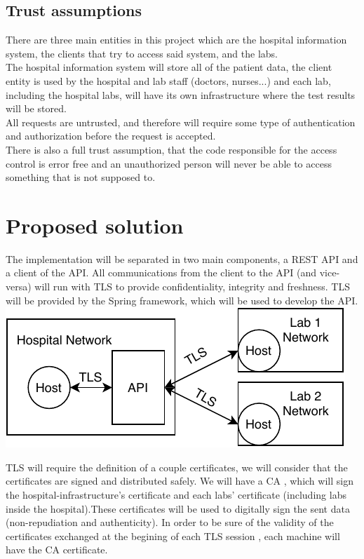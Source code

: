 \subsection{Trust assumptions}


There are three main entities in this project which are the hospital information system, the clients that try to access said system, and the labs. \\


The hospital information system will store all of the patient data, the client entity is used by the hospital and lab staff (doctors, nurses...) and each lab, including the hospital labs, will have its own infrastructure where the test results will be stored. \\

All requests are untrusted, and therefore will require some type of authentication and authorization before the request is accepted. \\ 

There is also a full trust assumption, that the code responsible for the access control is error free and an unauthorized person will never be able to access something that is not supposed to. \\

\section{Proposed solution}

The implementation will be separated in two main components, a REST API and a client of the API.
All communications from the client to the API (and vice-versa) will run with TLS to provide confidentiality, integrity and freshness. TLS will be provided by the Spring framework, which will be used to develop the API. \\

	\includegraphics[width=.4\textwidth]{figs/network_layout.pdf}
	
TLS will require the definition of a couple certificates, we will consider that the certificates are signed and distributed safely.
We will have a CA , which will sign the hospital-infrastructure's certificate and each labs' certificate (including labs inside the hospital).These certificates will be used to digitally sign the sent data (non-repudiation and authenticity).
In order to be sure of the validity of the certificates exchanged at the begining of each TLS session , each machine will have the CA certificate.\\ 

